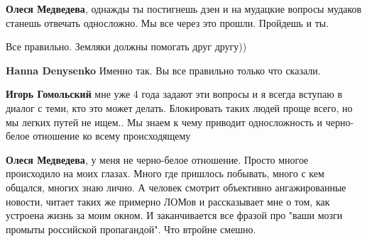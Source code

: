 \begin{itemize}
\begin{itemize}
\textbf{Олеся Медведева}, однажды ты постигнешь дзен и на мудацкие вопросы мудаков станешь отвечать односложно. Мы все через это прошли. Пройдешь и ты.

 
Все правильно. Земляки должны помогать друг другу))

 
\textbf{Hanna Denysenko} Именно так. Вы все правильно только что сказали.

 
\textbf{Игорь Гомольский} мне уже 4 года задают эти вопросы и я всегда вступаю
в диалог с теми, кто это может делать. Блокировать таких людей проще всего, но
мы легких путей не ищем.. Мы знаем к чему приводит односложность и черно-белое
отношение ко всему происходящему

 
\textbf{Олеся Медведева}, у меня не черно-белое отношение. Просто многое
происходило на моих глазах. Много где пришлось побывать, много с кем общался,
многих знаю лично. А человек смотрит объективно ангажированные новости, читает
таких же примерно ЛОМов и рассказывает мне о том, как устроена жизнь за моим
окном. И заканчивается все фразой про "ваши мозги промыты российской
пропагандой". Что втройне смешно.


 

\end{itemize}
\end{itemize}
